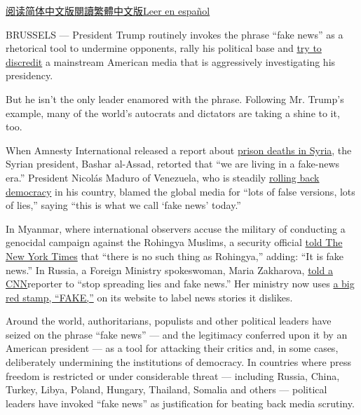 \href{http://cn.nytimes3xbfgragh.onion/world/20171213/trump-fake-news-dictators/}{阅读简体中文版}\href{http://cn.nytimes3xbfgragh.onion/world/20171213/trump-fake-news-dictators/zh-hant/}{閱讀繁體中文版}\href{https://www.nytimes3xbfgragh.onion/es/2017/12/14/los-politicos-autoritarios-adoptan-la-excusa-de-noticias-falsas-de-trump}{Leer
en español}

BRUSSELS --- President Trump routinely invokes the phrase ``fake news''
as a rhetorical tool to undermine opponents, rally his political base
and
\href{https://www.nytimes3xbfgragh.onion/2017/12/11/us/politics/trump-news-media-new-york-times.html}{try
to discredit} a mainstream American media that is aggressively
investigating his presidency.

But he isn't the only leader enamored with the phrase. Following Mr.
Trump's example, many of the world's autocrats and dictators are taking
a shine to it, too.

When Amnesty International released a report about
\href{https://www.amnesty.org/en/press-releases/2017/02/syria-investigation-uncovers-governments-secret-campaign-of-mass-hangings-and-extermination-at-saydnaya-prison/}{prison
deaths in Syria}, the Syrian president, Bashar al-Assad, retorted that
``we are living in a fake-news era.'' President Nicolás Maduro of
Venezuela, who is steadily
\href{https://www.nytimes3xbfgragh.onion/2017/07/29/world/americas/venezuela-nicolas-maduro-constituent-assembly.html}{rolling
back democracy} in his country, blamed the global media for ``lots of
false versions, lots of lies,'' saying ``this is what we call `fake
news' today.''

In Myanmar, where international observers accuse the military of
conducting a genocidal campaign against the Rohingya Muslims, a security
official
\href{https://www.nytimes3xbfgragh.onion/2017/12/02/world/asia/myanmar-rohingya-denial-history.html}{told
The New York Times} that ``there is no such thing as Rohingya,'' adding:
``It is fake news.'' In Russia, a Foreign Ministry spokeswoman, Maria
Zakharova,
\href{https://www.nytimes3xbfgragh.onion/2017/02/22/world/europe/russia-fake-news-media-foreign-ministry-.html?_r=0}{told
a CNN}reporter to ``stop spreading lies and fake news.'' Her ministry
now uses
\href{https://www.nytimes3xbfgragh.onion/2017/02/22/world/europe/russia-fake-news-media-foreign-ministry-.html?_r=0}{a
big red stamp, ``FAKE,''} on its website to label news stories it
dislikes.

Around the world, authoritarians, populists and other political leaders
have seized on the phrase ``fake news'' --- and the legitimacy conferred
upon it by an American president --- as a tool for attacking their
critics and, in some cases, deliberately undermining the institutions of
democracy. In countries where press freedom is restricted or under
considerable threat --- including Russia, China, Turkey, Libya, Poland,
Hungary, Thailand, Somalia and others --- political leaders have invoked
``fake news'' as justification for beating back media scrutiny.

